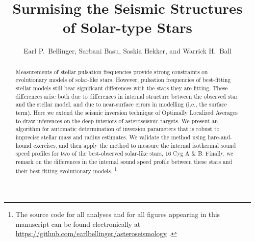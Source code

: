 \documentclass[twocolumn,twocolappendix]{aastex6}
\begin{document}
\title{Surmising the Seismic Structures of Solar-type Stars} 

\author{Earl P.~Bellinger, Sarbani Basu, Saskia Hekker, and Warrick H.~Ball}

\begin{abstract}
Measurements of stellar pulsation frequencies provide strong constraints on evolutionary models of solar-like stars. However, pulsation frequencies of best-fitting stellar models still bear significant differences with the stars they are fitting. These differences arise both due to differences in internal structure between the observed star and the stellar model, and due to near-surface errors in modelling (i.e., the surface term). 
Here we extend the seismic inversion technique of Optimally Localized Averages to draw inferences on the deep interiors of asteroseismic targets. We present an algorithm for automatic determination of inversion parameters that is robust to imprecise stellar mass and radius estimates. We validate the method using hare-and-hound exercises, and then apply the method to measure the internal isothermal sound speed profiles for two of the best-observed solar-like stars, 16 Cyg A \& B. Finally, we remark on the differences in the internal sound speed profile between these stars and their best-fitting evolutionary models.%
\footnote{The source code for all analyses and for all figures appearing in this manuscript can be found electronically at \url{https://github.com/earlbellinger/asteroseismology} \citep{earl_bellinger_2016_55400}.} %
\end{abstract}
\end{document}
